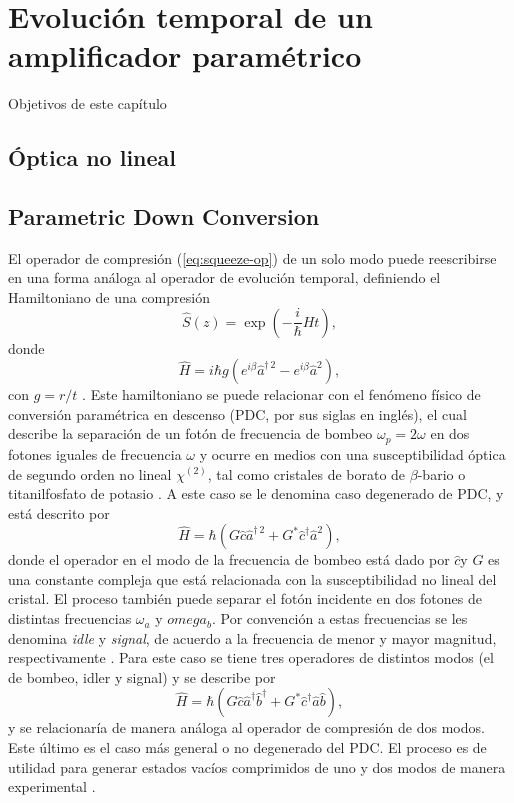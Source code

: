 \chapter{Evolución temporal de un amplificador paramétrico}

Objetivos de este capítulo

\section{Óptica no lineal}


\section{Parametric Down Conversion}
El operador de compresión (\ref{eq:squeeze-op}) de un solo modo puede reescribirse en una forma análoga al operador de evolución temporal, definiendo el Hamiltoniano de una compresión
\begin{equation}\label{eq:squeeze-op-time-ev}
  \hat{S}(z) = \exp(-\frac{i}{\hbar}Ht),
\end{equation}
donde
\begin{equation} \label{eq:hamiltionian-squeeze}
  \hat{H} = i\hbar g (e^{i\beta}\hat{a}^{\dagger\,2} - e^{i\beta}\hat{a}^2),
\end{equation}
con $g=r/t$ \cite{Agarwal_2012}.
Este hamiltoniano se puede relacionar con el fenómeno físico de conversión paramétrica en descenso (PDC, por sus siglas en inglés), el cual describe la separación de un fotón de frecuencia de bombeo $\omega_p=2\omega$ en dos fotones iguales de frecuencia $\omega$ y ocurre en medios con una susceptibilidad óptica de segundo orden no lineal $\chi^{(2)}$, tal como cristales de borato de $\beta$-bario o titanilfosfato de potasio \cite{Leonhardt}. A este caso se le denomina caso degenerado de PDC, y está descrito por
\begin{equation}
  \hat{H} = \hbar (G \hat{c} \hat{a}^{\dagger\,2} + G^* \hat{c}^{\dagger}\hat{a}^2),
\end{equation}
donde el operador  en el modo de la frecuencia de bombeo está dado por $\hat{c}$y $G$ es una constante compleja que está relacionada con la susceptibilidad no lineal  del cristal. El proceso también puede separar el fotón incidente en dos fotones de distintas frecuencias $\omega_a$ y $omega_b$. Por convención a estas frecuencias se les denomina \textit{idle} y \textit{signal}, de acuerdo a la frecuencia de menor y mayor magnitud, respectivamente \cite{Loudon}. Para este caso se tiene tres operadores de distintos modos (el de bombeo, idler y signal) y se describe por
\begin{equation}
  \hat{H} = \hbar(G \hat{c} \hat{a}^{\dagger} \hat{b}^{\dagger} + G^* \hat{c}^{\dagger} \hat{a} \hat{b}),
\end{equation}
y se relacionaría de manera análoga al operador de compresión de dos modos. Este último es el caso más general o no degenerado del PDC. El proceso es de utilidad para generar estados vacíos comprimidos de uno y dos modos de manera experimental \cite{Walls}.

